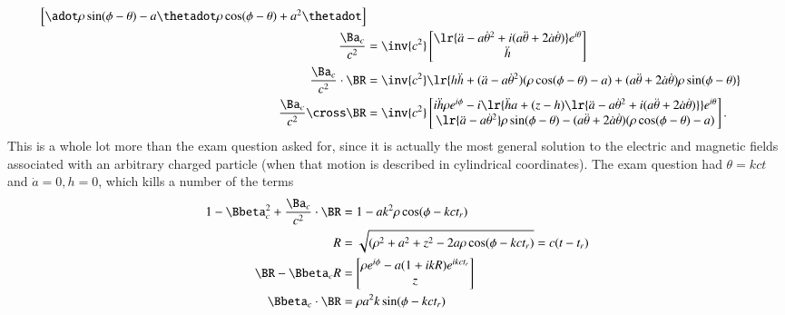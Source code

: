{\begin{equation}
\begin{aligned}
\begin{bmatrix}
\adot \rho \sin(\phi - \theta) - a \thetadot \rho \cos(\phi - \theta) + a^2 \thetadot
\end{bmatrix} \\
\frac{\Ba_c}{c^2} &=
\inv{c^2}
\begin{bmatrix}
\lr{
   \ddot{a} - a {\dot{\theta}}^2 + i ( a\ddot{\theta} + 2 \dot{a} \dot{\theta} ) 
}
e^{i\theta} \\
\ddot{h}
\end{bmatrix} \\
\frac{\Ba_c}{c^2} \cdot \BR &=
\inv{c^2} 
\lr{
   h \ddot{h} +
   ( \ddot{a} - a {\dot{\theta}}^2 ) (\rho \cos(\phi - \theta) - a)
   + (a \ddot{\theta} + 2 \dot{a} \dot{\theta}) \rho \sin(\phi - \theta) 
}
\\
\frac{\Ba_c}{c^2} \cross \BR
&=
\inv{c^2}
\begin{bmatrix}
i \ddot{h} \rho e^{i\phi}
- i 
\lr{
   \ddot{h} a + (z - h) 
   \lr{
      \ddot{a} - a {\dot{\theta}}^2 + i ( a\ddot{\theta} + 2 \dot{a} \dot{\theta} ) 
   }
}
e^{i\theta} \\
\lr{
   \ddot{a} - a {\dot{\theta}}^2 
}
\rho \sin(\phi - \theta)
-( a\ddot{\theta} + 2 \dot{a} \dot{\theta} ) (\rho \cos(\phi -\theta) - a)
\end{bmatrix}.
\end{aligned}
\end{equation}
%
This is a whole lot more than the exam question asked for, since it is actually the most general solution to the electric and magnetic fields associated with an arbitrary charged particle (when that motion is described in cylindrical coordinates).  The exam question had \(\theta = k c t\) and \(\dot{a} = 0, h = 0\), which kills a number of the terms
%
\begin{equation}\label{eqn:relativisticElectrodynamicsExamReflection:1010}
\begin{aligned}
1 - \Bbeta_c^2 + \frac{\Ba_c}{c^2} \cdot \BR &= 1 - a k^2 \rho \cos(\phi -  k c t_r) \\
R &= \sqrt{(\rho^2 + a^2 + z^2 - 2 a \rho \cos(\phi - k c t_r)} = c( t - t_r) \\
\BR - \Bbeta_c R &=
\begin{bmatrix}
\rho e^{i\phi} - a (1 + i k R) e^{i k c t_r} \\
z
\end{bmatrix} \\
\Bbeta_c \cdot \BR &= \rho a^2 k \sin(\phi -  k c t_r) \\

\end{aligned}
\end{equation}}
